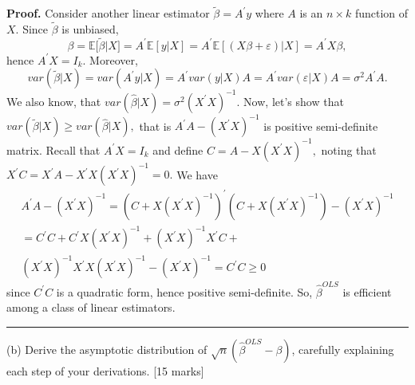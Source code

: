 \documentclass{article}
\newenvironment{proof}[1][Proof]{\noindent\textbf{#1.} }{\ \rule{0.5em}{0.5em}}
\begin{document}
\begin{proof}
Consider another linear estimator $\widetilde{\beta }=A^{\prime }y$ where $A$
is an $n\times k$ function of $X.$ Since $\widetilde{\beta }$ is unbiased, 
\begin{equation*}
\beta =\mathbb{E[}\widetilde{\beta }|X]=A^{\prime }\mathbb{E}\left[ y|X%
\right] =A^{\prime }\mathbb{E}\left[ \left( X\beta +\varepsilon \right) |X%
\right] =A^{\prime }X\beta ,
\end{equation*}%
hence $A^{\prime }X=I_{k}.$ Moreover, 
\begin{equation*}
var\left( \widetilde{\beta }|X\right) =var\left( A^{\prime }y|X\right)
=A^{\prime }var\left( y|X\right) A=A^{\prime }var\left( \varepsilon
|X\right) A=\sigma ^{2}A^{\prime }A.
\end{equation*}%
We also know, that $var\left( \hat{\beta}|X\right) =\sigma ^{2}(X^{\prime
}X)^{-1}.$ Now, let's show that $var\left( \widetilde{\beta }|X\right) \geq
var\left( \hat{\beta}|X\right) ,$ that is $A^{\prime }A-(X^{\prime }X)^{-1}$
is positive semi-definite matrix. Recall that $A^{\prime }X=I_{k}$ and
define $C=A-X\left( X^{\prime }X\right) ^{-1},$ noting that $X^{\prime
}C=X^{\prime }A-X^{\prime }X\left( X^{\prime }X\right) ^{-1}=0.$ We have 
\begin{gather*}
A^{\prime }A-(X^{\prime }X)^{-1}=\left( C+X\left( X^{\prime }X\right)
^{-1}\right) ^{\prime }\left( C+X\left( X^{\prime }X\right) ^{-1}\right)
-(X^{\prime }X)^{-1} \\
=C^{\prime }C+C^{\prime }X\left( X^{\prime }X\right) ^{-1}+\left( X^{\prime
}X\right) ^{-1}X^{\prime }C+ \\
\left( X^{\prime }X\right) ^{-1}X^{\prime }X\left( X^{\prime }X\right)
^{-1}-(X^{\prime }X)^{-1}=C^{\prime }C\geq 0
\end{gather*}%
since $C^{\prime }C$ is a quadratic form, hence positive semi-definite. So, $%
\widehat{\beta }^{OLS}$ is efficient among a class of linear estimators.
\end{proof}

(b) Derive the asymptotic distribution of $\sqrt{n}\left( \hat{\beta}%
^{OLS}-\beta \right) $, carefully explaining each step of your derivations.
[15 marks]
\end{document}
